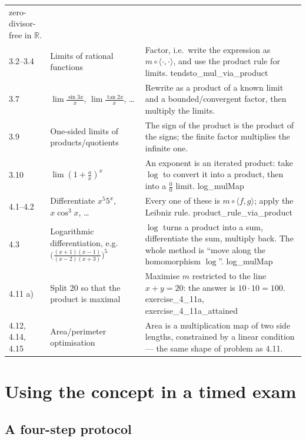 \documentclass[11pt,a4paper]{article}
\theoremstyle{definition}
\newcommand{\lean}[1]{\textsf{\small #1}}
\begin{document}
\begin{longtable}{@{}p{}p{}p{}@{}}
zero-divisor-free in $\mathbb{R}$.\\
3.2--3.4 & Limits of rational functions &
Factor, i.e.\ write the expression as $m\circ\langle\cdot,\cdot\rangle$, and use the product
rule for limits. \lean{tendsto\_mul\_via\_product}\\
3.7 & $\lim\frac{\sin 3x}{x}$, $\lim\frac{\tan 2x}{x}$, \dots &
Rewrite as a product of a known limit and a bounded/convergent factor, then multiply the
limits.\\
3.9 & One-sided limits of products/quotients &
The sign of the product is the product of the signs; the finite factor multiplies the
infinite one.\\
3.10 & $\lim(1+\tfrac{a}{x})^{x}$ &
An exponent is an iterated product: take $\log$ to convert it into a product, then into a
$\frac{0}{0}$ limit. \lean{log\_mulMap}\\
4.1--4.2 & Differentiate $x^5 5^x$, $x\cos^3 x$, \dots &
Every one of these is $m\circ\langle f,g\rangle$; apply the Leibniz rule.
\lean{product\_rule\_via\_product}\\
4.3 & Logarithmic differentiation, e.g.\ $\big(\tfrac{(x+1)(x-1)}{(x-2)(x+3)}\big)^5$ &
$\log$ turns a product into a sum, differentiate the sum, multiply back.  The whole method
is ``move along the homomorphism $\log$''. \lean{log\_mulMap}\\
4.11 a) & Split $20$ so that the product is maximal &
Maximise $m$ restricted to the line $x+y=20$: the answer is $10\cdot 10=100$.
\lean{exercise\_4\_11a}, \lean{exercise\_4\_11a\_attained}\\
4.12, 4.14, 4.15 & Area/perimeter optimisation &
Area is a multiplication map of two side lengths, constrained by a linear condition ---
the same shape of problem as 4.11.\\
\bottomrule
\end{longtable}

\section{Using the concept in a timed exam}\label{sec:exam}

\subsection{A four-step protocol}
\end{document}
